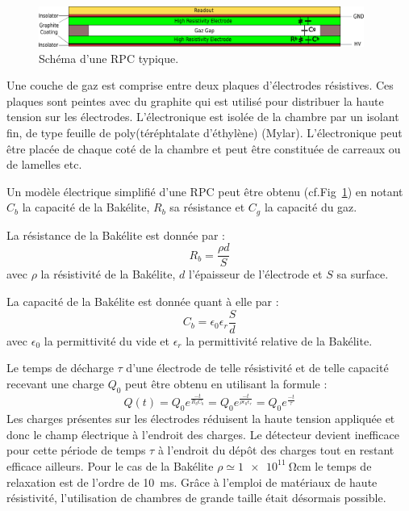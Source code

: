 \begin{figure}[th!]
	\centering
	\includegraphics[width=0.95\textwidth]{RPC/scheme_first.png}
	\captionsetup{type=figure}\caption{Schéma d'une RPC typique.}
	\label{RPCscheme}
\end{figure}
\vspace{-0.1cm}
Une couche de gaz est comprise entre deux plaques d'électrodes résistives. Ces plaques sont peintes avec du graphite qui est utilisé pour distribuer la haute tension sur les électrodes. L'électronique est isolée de la chambre par un isolant fin, de type feuille de poly(téréphtalate d'éthylène) (Mylar). L'électronique peut être placée de chaque coté de la chambre et peut être constituée de carreaux ou de lamelles etc.

Un modèle électrique simplifié d'une RPC peut être obtenu (cf.Fig~\ref{RPCscheme}) en notant $C_{b}$ la capacité de la Bakélite, $R_{b}$ sa résistance et $C_{g}$ la capacité du gaz.

La résistance de la Bakélite est donnée par :
\begin{equation}
R_b=\frac{\rho d}{S}
\end{equation}
avec $\rho$ la résistivité de la Bakélite, $d$ l'épaisseur de l'électrode et $S$ sa surface.

La capacité de la Bakélite est donnée quant à elle par :
\begin{equation}
C_{b}=\epsilon_0\epsilon_r\frac{S}{d}
\end{equation} 
avec $\epsilon_0$ la permittivité du vide et $\epsilon_r$ la permittivité relative de la Bakélite.

Le temps de décharge $\tau$ d'une électrode de telle résistivité et de telle capacité recevant une charge $Q_{0}$ peut être obtenu en utilisant la formule :
\begin{equation}
Q(t)=Q_{0}e^{\frac{-t}{R_bC_b}}=Q_{0}e^{\frac{-t}{\rho\epsilon_{0}\epsilon_{r}}}=Q_{0}e^{\frac{-t}{\tau}}
\end{equation}
Les charges présentes sur les électrodes réduisent la haute tension appliquée et donc le champ électrique à l'endroit des charges. Le détecteur devient inefficace pour cette période de temps $\tau$ à l'endroit du dépôt des charges tout en restant efficace ailleurs. Pour le cas de la Bakélite $\rho\simeq\SI{1e11}{\ohm\centi\meter}$ le temps de relaxation est de l'ordre de \SI{10}{\milli\second}. Grâce à l'emploi de matériaux de haute résistivité, l'utilisation de chambres de grande taille était désormais possible.


